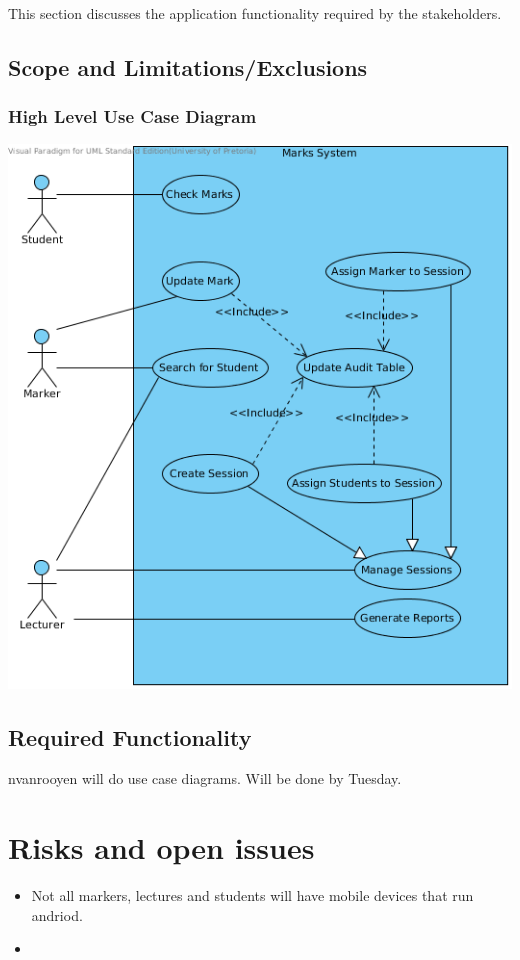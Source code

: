 \documentclass[12pt,a4paper]{article}
\begin{document}
\paragraph{}
This section discusses the application functionality required by the stakeholders.
\subsection{Scope and Limitations/Exclusions}
\subsubsection{High Level Use Case Diagram}
\includegraphics[width=\linewidth]{High_Level_Use_Case_Diagram.png}

\subsection{Required Functionality}
nvanrooyen will do use case diagrams. Will be done by Tuesday.
\section{Risks and open issues}
\begin{itemize}
\item Not all markers, lectures and students will have mobile devices that run andriod.
\item 
\end{itemize}
\end{document}
